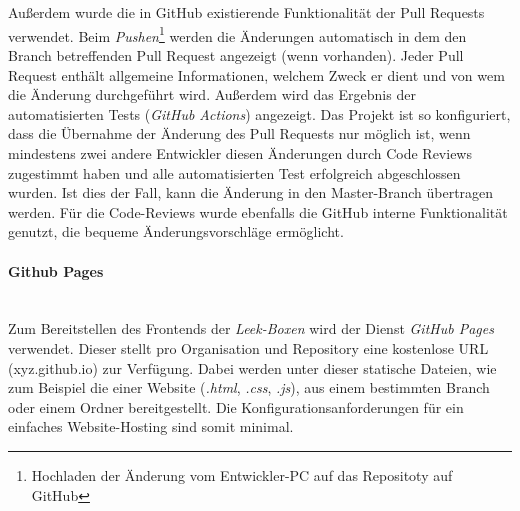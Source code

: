 \documentclass[10pt, a4paper]{article}
\begin{document}
\begin{onehalfspace}
      \\~\\
      Außerdem wurde die in GitHub existierende Funktionalität der Pull Requests verwendet. Beim \textit{Pushen}\footnote{Hochladen der Änderung vom Entwickler-PC auf das Repositoty auf GitHub}
      werden die Änderungen automatisch in dem den Branch betreffenden Pull Request angezeigt (wenn vorhanden).
      Jeder Pull Request enthält allgemeine Informationen, welchem Zweck er dient und von wem die Änderung durchgeführt wird. Außerdem wird das Ergebnis der automatisierten Tests (\textit{GitHub Actions}) angezeigt.
      Das Projekt ist so konfiguriert, dass die Übernahme der Änderung des Pull Requests nur möglich ist, wenn mindestens zwei andere Entwickler diesen Änderungen
      durch Code Reviews zugestimmt haben und alle automatisierten Test erfolgreich abgeschlossen wurden. Ist dies der Fall, kann die Änderung in den Master-Branch übertragen werden.
      Für die Code-Reviews wurde ebenfalls die GitHub interne Funktionalität genutzt, die bequeme Änderungsvorschläge ermöglicht.

      \paragraph{Github Pages} $~$ \\
      Zum Bereitstellen des Frontends der \textit{Leek-Boxen} wird der Dienst \textit{GitHub Pages} verwendet. Dieser stellt pro Organisation und Repository eine kostenlose URL (xyz.github.io) zur Verfügung.
      Dabei werden unter dieser statische Dateien, wie zum Beispiel die einer Website (\textit{.html}, \textit{.css}, \textit{.js}), aus einem bestimmten Branch oder einem Ordner bereitgestellt.
      Die Konfigurationsanforderungen für ein einfaches Website-Hosting sind somit minimal.


\end{onehalfspace}
\end{document}
